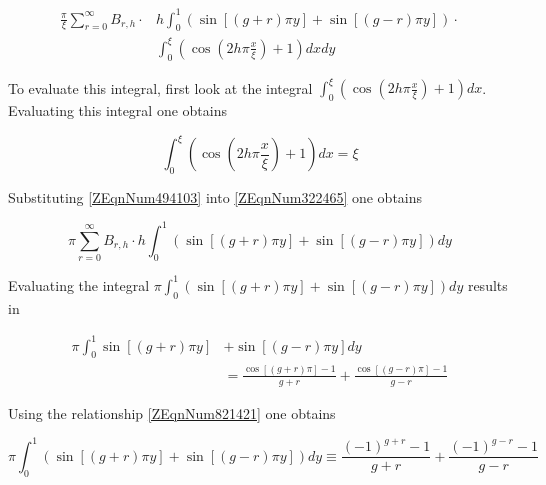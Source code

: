 \begin{equation} \label{ZEqnNum322465} \begin{split}
    \frac{\pi }{\xi } \sum _{r=0}^{\infty} B_{r,h} \cdot 
    & h\int _{0}^{1} \left( \sin \left[ \left( g + r \right) \pi y \right] + 
    \sin \left[ \left(g - r\right) \pi y \right] \right) \cdot \\
    & \int _{0}^{\xi} \left(\cos \left(2h\pi \frac{x}{\xi} \right) + 1\right) dxdy 
\end{split} \end{equation} 

To evaluate this integral, first look at the integral $\int _{0}^{\xi} 
\left(\cos \left(2h\pi \frac{x}{\xi } \right)+1\right) dx$. Evaluating this
integral one obtains

\begin{equation} \label{ZEqnNum494103} \int _{0}^{\xi } \left(\cos \left(2h\pi
\frac{x}{\xi } \right)+1\right) dx=\xi \end{equation}

Substituting \eqref{ZEqnNum494103} into \eqref{ZEqnNum322465} one obtains

\begin{equation} \label{ZEqnNum504644} \pi \sum _{r=0}^{\infty }B_{r,h} \cdot
h\int _{0}^{1} \left(\sin \left[\left(g+r\right)\pi y\right]+\sin
\left[\left(g-r\right)\pi y\right]\right) dy \end{equation}

Evaluating the integral $\pi \int _{0}^{1} \left(\sin \left[\left(g+r\right)\pi
y\right]+\sin \left[\left(g-r\right)\pi y\right]\right) dy$ results in

\begin{equation*} \begin{split}
    \pi \int _{0}^{1} \sin \left[\left(g + r\right)\pi y\right]
    & + \sin \left[\left(g - r\right) \pi y\right] dy \\
    & = \frac{\cos \left[\left(g + r\right)\pi \right] - 1}{g + r} 
    + \frac{\cos \left[\left(g - r \right) \pi \right] - 1}{g - r} 
\end{split} \end{equation*} 

Using the relationship \eqref{ZEqnNum821421} one obtains

\begin{equation*}
    \pi \int _{0}^{1} \left(\sin \left[\left(g+r\right)\pi y\right]+\sin
    \left[\left(g-r\right)\pi y\right]\right) dy\equiv \frac{\left(-1\right)^{g+r}
    -1}{g+r} +\frac{\left(-1\right)^{g-r} -1}{g-r} 
\end{equation*}

